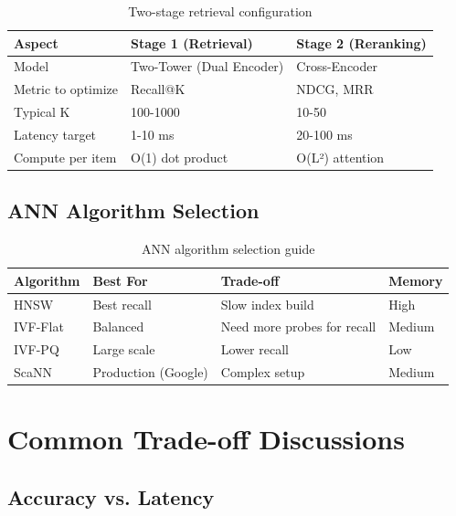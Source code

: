 \begin{table}[H]
\centering
\caption{Two-stage retrieval configuration}
\begin{tabularx}{\textwidth}{lXX}
\toprule
\textbf{Aspect} & \textbf{Stage 1 (Retrieval)} & \textbf{Stage 2 (Reranking)} \\
\midrule
Model & Two-Tower (Dual Encoder) & Cross-Encoder \\
Metric to optimize & Recall@K & NDCG, MRR \\
Typical K & 100-1000 & 10-50 \\
Latency target & 1-10 ms & 20-100 ms \\
Compute per item & O(1) dot product & O(L²) attention \\
\bottomrule
\end{tabularx}
\end{table}

\subsection{ANN Algorithm Selection}

\begin{table}[H]
\centering
\caption{ANN algorithm selection guide}
\begin{tabularx}{\textwidth}{lXXX}
\toprule
\textbf{Algorithm} & \textbf{Best For} & \textbf{Trade-off} & \textbf{Memory} \\
\midrule
HNSW & Best recall & Slow index build & High \\
IVF-Flat & Balanced & Need more probes for recall & Medium \\
IVF-PQ & Large scale & Lower recall & Low \\
ScaNN & Production (Google) & Complex setup & Medium \\
\bottomrule
\end{tabularx}
\end{table}

\section{Common Trade-off Discussions}
\label{sec:tradeoffs}

\subsection{Accuracy vs. Latency}

